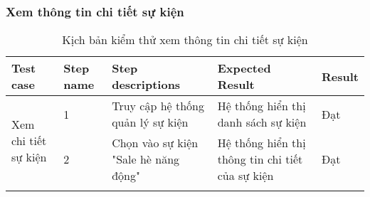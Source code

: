\subsubsection{Xem thông tin chi tiết sự kiện}
{
    \setlength\extrarowheight{6pt}
    \begin{longtable}{| p{2.5cm}| p{1cm}| p{5.5cm}| p{4.5cm} | p{1.5cm} |}
        \hline
        \textbf{Test case}                           & \textbf{Step name} & \textbf{Step descriptions}           & \textbf{Expected Result}                         & \textbf{Result} \\
        \hline
        \multirow[c]{2}{2.5cm}{Xem chi tiết sự kiện} & 1                  & Truy cập hệ thống quản lý sự kiện    & Hệ thống hiển thị danh sách sự kiện              & Đạt             \\
        \cline{2-5}
                                                     & 2                  & Chọn vào sự kiện "Sale hè năng động" & Hệ thống hiển thị thông tin chi tiết của sự kiện & Đạt             \\
        \hline
        \caption{Kịch bản kiểm thử xem thông tin chi tiết sự kiện}
    \end{longtable}
}

\newpage

